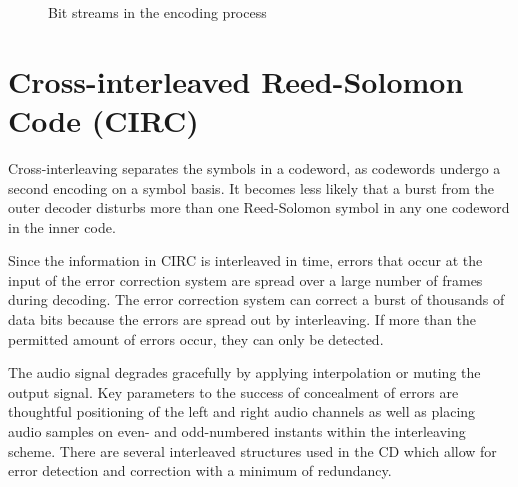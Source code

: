 \documentclass[../main.tex]{subfiles}
\begin{document}
\begin{figure}[h!tp]
        \caption{Bit streams in the encoding process}
        \label{fig:bit_streams}
    \end{figure}
    \newpage



    \newpage


    \section{Cross-interleaved Reed-Solomon Code (CIRC)}

    Cross-interleaving separates the symbols in a codeword, as codewords undergo a second encoding on a symbol basis. It becomes less likely that a burst from the outer decoder disturbs more than one Reed-Solomon symbol in any one codeword in the inner code.

    Since the information in CIRC is interleaved in time, errors that occur at the input of the error correction system are spread over a large number of frames during decoding. The error correction system can correct a burst of thousands of data bits because the errors are spread out by interleaving. If more than the permitted amount of errors occur, they can only be detected.

    The audio signal degrades gracefully by applying interpolation or muting the output signal. Key parameters to the success of concealment of errors are thoughtful positioning of the left and right audio channels as well as placing audio samples on even- and odd-numbered instants within the interleaving scheme. There are several interleaved structures used in the CD which allow for error detection and correction with a minimum of redundancy.
\end{document}
